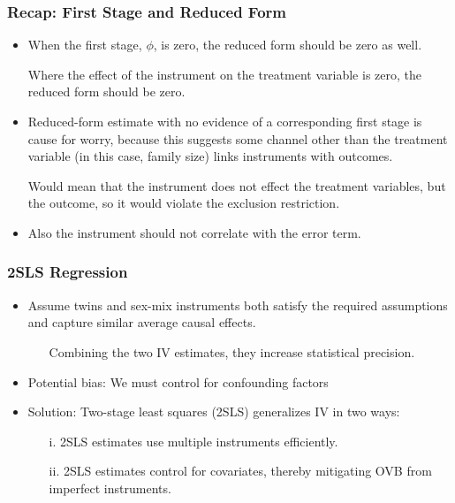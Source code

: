 \documentclass{beamer}
\begin{document}
\begin{frame}
\frametitle{Recap: First Stage and Reduced Form}

\begin{itemize}
	\item When the first stage, $\phi$, is zero, the reduced form should be zero as well.
	\item[\rightarrow] Where the effect of the instrument on the treatment variable is zero, the reduced form should be zero.
	\item Reduced-form estimate with no evidence of a corresponding first stage is cause for worry, because this suggests some channel other than the treatment variable (in this case, family size) links
instruments with outcomes.
	\item[\rightarrow] Would mean that the instrument does not effect the treatment variables, but the outcome, so it would violate the exclusion restriction.
	\item Also the instrument should not correlate with the error term.
\end{itemize}

\end{frame}


\begin{frame}
\frametitle{2SLS Regression}
\begin{itemize}
	\item Assume twins and sex-mix instruments both satisfy the required assumptions and capture similar average causal effects.
	\begin{itemize}
		\item[\rightarrow] Combining the two IV estimates, they increase statistical precision.
	\end{itemize}
	\item Potential bias: We must control for confounding factors
	\item Solution: Two-stage least squares (2SLS) generalizes IV in two ways:
	\begin{itemize}
		\item[i.] 2SLS estimates use multiple instruments efficiently.
		\item[ii.] 2SLS estimates control for covariates, thereby mitigating OVB from imperfect instruments.
	\end{itemize}
\end{itemize}

\end{frame}
\end{document}
